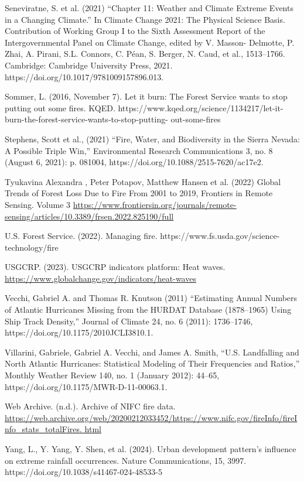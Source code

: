 \documentclass[12pt,paper=a4,DIV=12,parskip=never,chapterprefix=false,headings=standardclasses]{scrreprt}
\begin{document}
Seneviratne, S. et al. (2021) “Chapter 11: Weather and Climate Extreme Events in a Changing Climate.”
In Climate Change 2021: The Physical Science Basis. Contribution of Working Group I to the Sixth
Assessment Report of the Intergovernmental Panel on Climate Change, edited by V. Masson-
Delmotte, P. Zhai, A. Pirani, S.L. Connors, C. Péan, S. Berger, N. Caud, et al., 1513–1766.
Cambridge: Cambridge University Press, 2021. https://doi.org/10.1017/9781009157896.013.

Sommer, L. (2016, November 7). Let it burn: The Forest Service wants to stop putting out some fires.
KQED. https://www.kqed.org/science/1134217/let-it-burn-the-forest-service-wants-to-stop-putting-
out-some-fires

Stephens, Scott et al., (2021) “Fire, Water, and Biodiversity in the Sierra Nevada: A Possible Triple Win,”
Environmental Research Communications 3, no. 8 (August 6, 2021): p. 081004,
https://doi.org/10.1088/2515-7620/ac17e2.

Tyukavina Alexandra , Peter Potapov, Matthew Hansen et al. (2022) Global Trends of Forest Loss Due to
Fire From 2001 to 2019, Frontiers in Remote Sensing. Volume 3
\url{https://www.frontiersin.org/journals/remote-sensing/articles/10.3389/frsen.2022.825190/full}

U.S. Forest Service. (2022). Managing fire. https://www.fs.usda.gov/science-technology/fire

USGCRP. (2023). USGCRP indicators platform: Heat waves.
\url{https://www.globalchange.gov/indicators/heat-waves}

Vecchi, Gabriel A. and Thomas R. Knutson (2011) “Estimating Annual Numbers of Atlantic Hurricanes
Missing from the HURDAT Database (1878–1965) Using Ship Track Density,” Journal of Climate
24, no. 6 (2011): 1736–1746, https://doi.org/10.1175/2010JCLI3810.1.

Villarini, Gabriele, Gabriel A. Vecchi, and James A. Smith, “U.S. Landfalling and North Atlantic
Hurricanes: Statistical Modeling of Their Frequencies and Ratios,” Monthly Weather Review 140, no.
1 (January 2012): 44–65, https://doi.org/10.1175/MWR-D-11-00063.1.

Web Archive. (n.d.). Archive of NIFC fire data.
\url{https://web.archive.org/web/20200212033452/https://www.nifc.gov/fireInfo/fireInfo_stats_totalFires.
html}

Yang, L., Y. Yang, Y. Shen, et al. (2024). Urban development pattern’s influence on extreme rainfall
occurrences. Nature Communications, 15, 3997. https://doi.org/10.1038/s41467-024-48533-5
\end{document}
